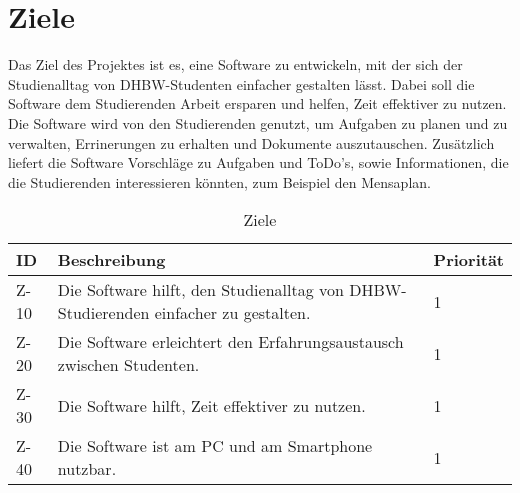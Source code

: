 
\chapter{Ziele}
Das Ziel des Projektes ist es, eine Software zu entwickeln, mit der sich der Studienalltag von DHBW-Studenten einfacher gestalten lässt. Dabei soll die Software dem Studierenden Arbeit ersparen und helfen, Zeit effektiver zu nutzen. Die Software wird von den Studierenden genutzt, um  Aufgaben zu planen und zu verwalten, Errinerungen zu erhalten und Dokumente auszutauschen. Zusätzlich liefert die Software Vorschläge zu Aufgaben und ToDo's, sowie Informationen, die die Studierenden interessieren könnten, zum Beispiel den Mensaplan. 

\begin{table}[H]
\caption{Ziele}
\label{ziele:entwicklungsziele}
\begin{tabularx}{\textwidth}{|l|X|l|}
\toprule
\textbf{ID} & \textbf{Beschreibung} & \textbf{Priorität}\\
\endhead
\hline
Z-10 & Die Software hilft, den Studienalltag von DHBW-Studierenden einfacher zu gestalten. & 1 \\
Z-20 & Die Software erleichtert den Erfahrungsaustausch zwischen Studenten. & 1 \\
Z-30 & Die Software hilft, Zeit effektiver zu nutzen. & 1\\
Z-40 & Die Software ist am PC und am Smartphone nutzbar. & 1\\
\hline
\end{tabularx}
\end{table}
